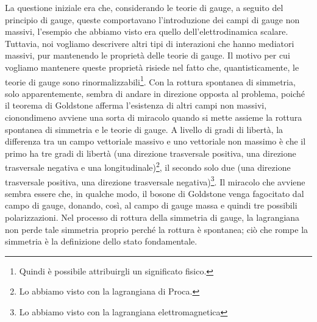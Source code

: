 La questione iniziale era che, considerando le teorie di gauge, a seguito del principio di gauge, queste comportavano l'introduzione dei campi di gauge non massivi, l'esempio che abbiamo visto era quello dell'elettrodinamica scalare. Tuttavia, noi vogliamo descrivere altri tipi di interazioni che hanno mediatori massivi, pur mantenendo le proprietà delle teorie di gauge. Il motivo per cui vogliamo mantenere queste proprietà risiede nel fatto che, quantisticamente, le teorie di gauge sono rinormalizzabili\footnote{Quindi è possibile attribuirgli un significato fisico.}. Con la rottura spontanea di simmetria, solo apparentemente, sembra di andare in direzione opposta al problema, poiché il teorema di Goldstone afferma l'esistenza di altri campi non massivi, cionondimeno avviene una sorta di miracolo quando si mette assieme la rottura spontanea di simmetria e le teorie di gauge. A livello di gradi di libertà, la differenza tra un campo vettoriale massivo e uno vettoriale non massimo è che il primo ha tre gradi di libertà (una direzione trasversale positiva, una direzione trasversale negativa e una longitudinale)\footnote{Lo abbiamo visto con la lagrangiana di Proca.}, il secondo solo due (una direzione trasversale positiva, una direzione trasversale negativa)\footnote{Lo abbiamo visto con la lagrangiana elettromagnetica}. Il miracolo che avviene sembra essere che, in qualche modo, il bosone di Goldstone venga fagocitato dal campo di gauge, donando, così, al campo di gauge massa e quindi tre possibili polarizzazioni. Nel processo di rottura della simmetria di gauge, la lagrangiana non perde tale simmetria proprio perché la rottura è spontanea; ciò che rompe la simmetria è la definizione dello stato fondamentale.





























